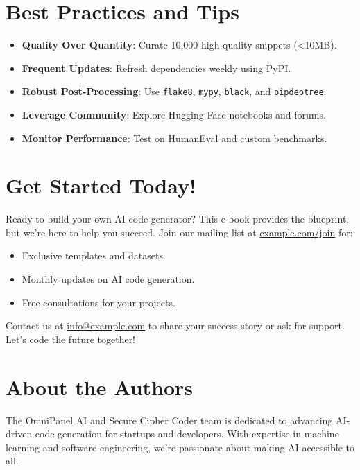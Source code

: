 \documentclass[12pt]{article}
\begin{document}
\section{Best Practices and Tips}
\begin{itemize}
  \item \textbf{Quality Over Quantity}: Curate 10,000 high-quality snippets (<10MB).
  \item \textbf{Frequent Updates}: Refresh dependencies weekly using PyPI.
  \item \textbf{Robust Post-Processing}: Use \texttt{flake8}, \texttt{mypy}, \texttt{black}, and \texttt{pipdeptree}.
  \item \textbf{Leverage Community}: Explore Hugging Face notebooks and forums.
  \item \textbf{Monitor Performance}: Test on HumanEval and custom benchmarks.
\end{itemize}

\section{Get Started Today!}
Ready to build your own AI code generator? This e-book provides the blueprint, but we’re here to help you succeed. Join our mailing list at \href{https://example.com/join}{example.com/join} for:
\begin{itemize}
  \item Exclusive templates and datasets.
  \item Monthly updates on AI code generation.
  \item Free consultations for your projects.
\end{itemize}
Contact us at \href{mailto:info@example.com}{info@example.com} to share your success story or ask for support. Let’s code the future together!

\section{About the Authors}
The OmniPanel AI and Secure Cipher Coder team is dedicated to advancing AI-driven code generation for startups and developers. With expertise in machine learning and software engineering, we’re passionate about making AI accessible to all.
\end{document}
